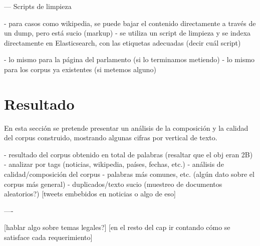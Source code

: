 --- Scripts de limpieza

- para casos como wikipedia, se puede bajar el contenido directamente a través de un dump, pero está
  sucio (markup)
- se utiliza un script de limpieza y se indexa directamente en Elasticsearch, con las etiquetas
  adecuadas (decir cuál script)

- lo mismo para la página del parlamento (si lo terminamos metiendo)
- lo mismo para los corpus ya existentes (si metemos alguno)


\section{Resultado}

En esta sección se pretende presentar un análisis de la composición y la calidad del corpus
construido, mostrando algunas cifras por vertical de texto.


- resultado del corpus obtenido en total de palabras (resaltar que el obj eran 2B)
- analizar por tags (noticias, wikipedia, países, fechas, etc.)
- análisis de calidad/composición del corpus
    - palabras más comunes, etc. (algún dato sobre el corpus más general)
    - duplicados/texto sucio (muestreo de documentos aleatorios?)
    [tweets embebidos en noticias o algo de eso]


----

[hablar algo sobre temas legales?]
[en el resto del cap ir contando cómo se satisface cada requerimiento]